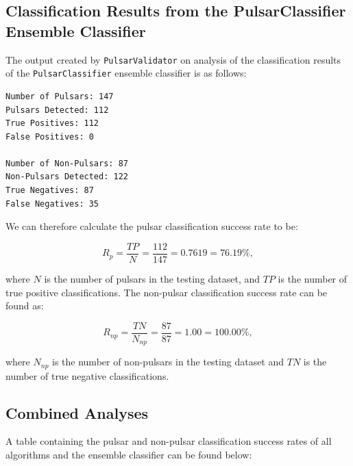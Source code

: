 \documentclass{article}
\begin{document}
\subsection{Classification Results from the PulsarClassifier Ensemble Classifier}

The output created by \verb|PulsarValidator| on analysis of the classification results of the \verb|PulsarClassifier| ensemble classifier is as follows:

\begin{lstlisting}[numbers=none]
Number of Pulsars: 147
Pulsars Detected: 112
True Positives: 112
False Positives: 0

Number of Non-Pulsars: 87
Non-Pulsars Detected: 122
True Negatives: 87
False Negatives: 35
\end{lstlisting}

We can therefore calculate the pulsar classification success rate to be:

$$ R_{p} = \frac{TP}{N} = \frac{112}{147} =  0.7619 = 76.19\%,$$

where $N$ is the number of pulsars in the testing dataset, and $TP$ is the number of true positive classifications. The non-pulsar classification success rate can be found as:

$$R_{np} = \frac{TN}{N_{np}} = \frac{87}{87} = 1.00 = 100.00\%,$$

where $N_{np}$ is the number of non-pulsars in the testing dataset and $TN$ is the number of true negative classifications.

\subsection{Combined Analyses}

A table containing the pulsar and non-pulsar classification success rates of all algorithms and the ensemble classifier can be found below:
\end{document}
